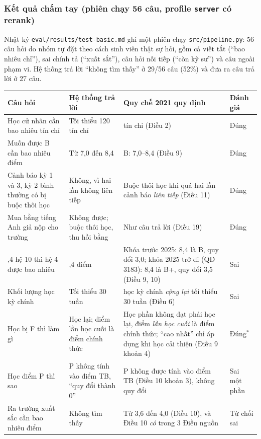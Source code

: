 \subsubsection{Kết quả chấm tay (phiên chạy 56 câu, profile \texttt{server} có rerank)}
\label{sec:tra-loi-thu-cong}

Nhật ký \texttt{eval/results/test-basic.md} ghi một phiên chạy \texttt{src/pipeline.py}: 56 câu hỏi do
nhóm tự đặt theo cách sinh viên thật sự hỏi, gồm cả viết tắt (``bao nhiêu chỉ''), sai chính tả
(``xuất sắt''), câu hỏi nối tiếp (``còn kỹ sư'') và câu ngoài phạm vi. Hệ thống trả lời ``không tìm
thấy'' ở 29/56 câu (52\%) và đưa ra câu trả lời ở 27 câu.

\begin{table}[H]
  \centering
  \small
  \begin{tabularx}{\textwidth}{>{\hsize=0.95\hsize}X >{\hsize=0.95\hsize}X >{\hsize=1.1\hsize}X l}
    \toprule
    \textbf{Câu hỏi} & \textbf{Hệ thống trả lời} & \textbf{Quy chế 2021 quy định} & \textbf{Đánh giá} \\
    \midrule
    Học cử nhân cần bao nhiêu tín chỉ & Tối thiểu 120 tín chỉ & 120 tín chỉ (Điều 2) & Đúng \\
    Muốn được B cần bao nhiêu điểm & Từ 7,0 đến 8,4 & B: 7,0--8,4 (Điều 9) & Đúng \\
    Cảnh báo kỳ 1 và 3, kỳ 2 bình thường có bị buộc thôi học & Không, vì hai lần không liên tiếp & Buộc thôi học khi quá hai lần cảnh báo \emph{liên tiếp} (Điều 11) & Đúng \\
    Mua bằng tiếng Anh giả nộp cho trường & Không được; buộc thôi học, thu hồi bằng & Như câu trả lời (Điều 19) & Đúng \\
    \midrule
    8,4 hệ 10 thì hệ 4 được bao nhiêu & 3,4 điểm & Khóa trước 2025: 8,4 là B, quy đổi 3,0; khóa 2025 trở đi (QĐ 3183): 8,4 là B+, quy đổi 3,5 (Điều 9, 10) & Sai \\
    Khối lượng học kỳ chính & Tối thiểu 30 tuần & 2 học kỳ chính \emph{cộng lại} tối thiểu 30 tuần (Điều 6) & Sai \\
    Học bị F thì làm gì & Học lại; điểm lần học cuối là điểm chính thức & Học phần không đạt phải học lại, điểm \emph{lần học cuối} là điểm chính thức; ``cao nhất'' chỉ áp dụng khi học cải thiện (Điều 9 khoản 4) & Đúng$^{*}$ \\
    Học điểm P thì sao & P không tính vào điểm TB, ``quy đổi thành 0'' & P không được tính vào điểm TB (Điều 10 khoản 3), không quy đổi & Sai một phần \\
    \midrule
    Ra trường xuất sắc cần bao nhiêu điểm & Không tìm thấy & Từ 3,6 đến 4,0 (Điều 10), và Điều 10 \emph{có} trong 3 Điều nguồn & Từ chối sai \\

\end{tabularx}
\end{table}
